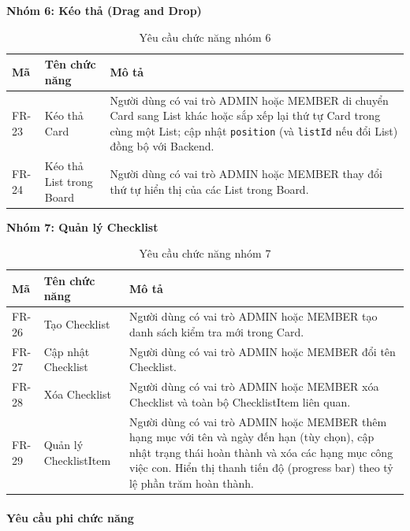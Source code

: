 \textbf{Nhóm 6: Kéo thả (Drag and Drop)}

\begin{table}[H]
\centering
\begin{tabular}{|p{1.8cm}|p{4cm}|p{8.2cm}|}
\hline
\textbf{Mã} & \textbf{Tên chức năng} & \textbf{Mô tả} \\
\hline
FR-23 & Kéo thả Card & Người dùng có vai trò ADMIN hoặc MEMBER di chuyển Card sang List khác hoặc sắp xếp lại thứ tự Card trong cùng một List; cập nhật \texttt{position} (và \texttt{listId} nếu đổi List) đồng bộ với Backend. \\
\hline
FR-24 & Kéo thả List trong Board & Người dùng có vai trò ADMIN hoặc MEMBER thay đổi thứ tự hiển thị của các List trong Board. \\
\hline
\end{tabular}
\caption{Yêu cầu chức năng nhóm 6}
\label{tab:fr_dnd}
\end{table}

\textbf{Nhóm 7: Quản lý Checklist}

\begin{table}[H]
\centering
\begin{tabular}{|p{1.8cm}|p{4cm}|p{8.2cm}|}
\hline
\textbf{Mã} & \textbf{Tên chức năng} & \textbf{Mô tả} \\
\hline
FR-26 & Tạo Checklist & Người dùng có vai trò ADMIN hoặc MEMBER tạo danh sách kiểm tra mới trong Card. \\
\hline
FR-27 & Cập nhật Checklist & Người dùng có vai trò ADMIN hoặc MEMBER đổi tên Checklist. \\
\hline
FR-28 & Xóa Checklist & Người dùng có vai trò ADMIN hoặc MEMBER xóa Checklist và toàn bộ ChecklistItem liên quan. \\
\hline
FR-29 & Quản lý ChecklistItem & Người dùng có vai trò ADMIN hoặc MEMBER thêm hạng mục với tên và ngày đến hạn (tùy chọn), cập nhật trạng thái hoàn thành và xóa các hạng mục công việc con. Hiển thị thanh tiến độ (progress bar) theo tỷ lệ phần trăm hoàn thành. \\
\hline
\end{tabular}
\caption{Yêu cầu chức năng nhóm 7}
\label{tab:fr_checklist}
\end{table}



\paragraph{Yêu cầu phi chức năng} \mbox{}\\

